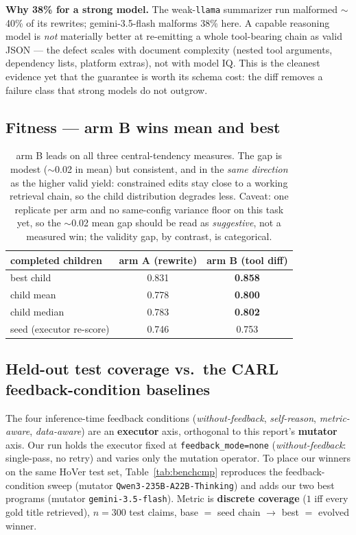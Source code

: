 \documentclass[11pt]{article}
\newcommand{\armA}{\textcolor{bad}{arm A}}
\newcommand{\armB}{\textcolor{accent}{arm B}}
\begin{document}
\noindent\textbf{Why 38\% for a strong model.} The weak-\texttt{llama} summarizer run malformed
$\sim$40\% of its rewrites; gemini-3.5-flash malforms 38\% here. A capable reasoning model is
\emph{not} materially better at re-emitting a whole tool-bearing chain as valid JSON --- the
defect scales with document complexity (nested tool arguments, dependency lists, platform
extras), not with model IQ. This is the cleanest evidence yet that the guarantee is worth its
schema cost: the diff removes a failure class that strong models do not outgrow.

\subsection{Fitness --- \armB{} wins mean and best}
\begin{table}[H]\centering
\begin{tabular}{lcc}
\toprule
completed children & \armA{} (rewrite) & \armB{} (tool diff) \\
\midrule
best child & 0.831 & \textbf{\textcolor{good}{0.858}} \\
child mean & 0.778 & \textbf{\textcolor{good}{0.800}} \\
child median & 0.783 & \textbf{\textcolor{good}{0.802}} \\
seed (executor re-score) & 0.746 & 0.753 \\
\bottomrule
\end{tabular}
\caption{\armB{} leads on all three central-tendency measures. The gap is modest ($\sim$0.02 in
mean) but consistent, and in the \emph{same direction} as the higher valid yield: constrained
edits stay close to a working retrieval chain, so the child distribution degrades less. Caveat:
one replicate per arm and no same-config variance floor on this task yet, so the $\sim$0.02
mean gap should be read as \emph{suggestive}, not a measured win; the validity gap, by contrast,
is categorical.}
\end{table}

\subsection{Held-out test coverage vs.\ the CARL feedback-condition baselines}
\label{sec:benchcmp}
The four inference-time feedback conditions (\emph{without-feedback}, \emph{self-reason},
\emph{metric-aware}, \emph{data-aware}) are an \textbf{executor} axis, orthogonal to this
report's \textbf{mutator} axis. Our run holds the executor fixed at \texttt{feedback\_mode=none}
(\emph{without-feedback}: single-pass, no retry) and varies only the mutation operator. To place
our winners on the same HoVer test set, Table~\ref{tab:benchcmp} reproduces the feedback-condition
sweep (mutator \texttt{Qwen3-235B-A22B-Thinking}) and adds our two best programs (mutator
\texttt{gemini-3.5-flash}). Metric is \textbf{discrete coverage} ($1$ iff every gold title
retrieved), $n=300$ test claims, base $=$ seed chain $\to$ best $=$ evolved winner.
\end{document}
